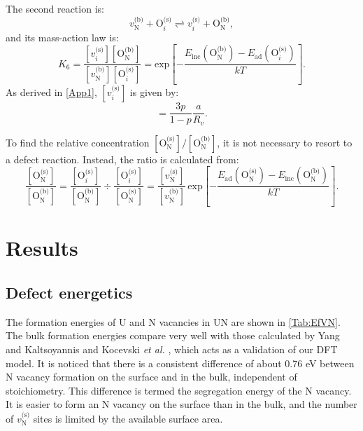 \documentclass[preprint,12pt,sort&compress]{elsarticle}
\newcommand{\?}{\stackrel{?}{=}}
\begin{document}
The second reaction is:
\begin{equation}
v_\text{N}^\text{(b)} + \text{O}_i^\text{(s)}  \rightleftharpoons v_i^\text{(s)} + \text{O}_\text{N}^\text{(b)},
\end{equation}
and its mass-action law is:
\begin{equation}
K_6 = \frac{ [ v_i^\text{(s)} ]  [ \text{O}_\text{N}^\text{(b)} ] } { [ v_\text{N}^\text{(b)} ] [ \text{O}_i^\text{(s)} ] } = \text{exp}\! \left[ - \frac{ E_\text{inc}( \text{O}_\text{N}^\text{(b)} ) - E_\text{ad}( \text{O}_i^\text{(s)} ) } { k T } \right].
\end{equation}
As derived in \ref{App1}, $[ v_i^\text{(s)} ]$ is given by:
\begin{equation}
[ v_i^\text{(s)} ] = \frac{3p}{1-p} \frac{a}{R_v}.
\label{Eq:v_i^s}
\end{equation}

To find the relative concentration $[ \text{O}_\text{N}^\text{(s)} ] / [ \text{O}_\text{N}^\text{(b)} ]$, it is not necessary to resort to a defect reaction. Instead, the ratio is calculated from: 
\begin{equation}
\frac{ [ \text{O}_\text{N}^\text{(s)} ] }{ [ \text{O}_\text{N}^\text{(b)} ] } = \frac{ [ \text{O}_i^\text{(s)} ] }{ [ \text{O}_\text{N}^\text{(b)} ] } \div \frac{ [ \text{O}_i^\text{(s)} ] }{ [ \text{O}_\text{N}^\text{(s)} ] } = \frac{ [v_\text{N}^\text{(s)}] }{ [v_\text{N}^\text{(b)}] } \, \text{exp}\! \left[ - \frac{ E_\text{ad}( \text{O}_\text{N}^\text{(s)} ) - E_\text{inc}( \text{O}_\text{N}^\text{(b)} ) } { k T } \right].
\label{Eq:ONs_ONb}
\end{equation}

\section{Results}
\label{Sec:Results}

\subsection{Defect energetics}
\label{Sec:DefE}

The formation energies of U and N vacancies in UN are shown in \cref{Tab:EfVN}. The bulk formation energies compare very well with those calculated by Yang and Kaltsoyannis \cite{Yang2021} and Kocevski \textit{et al.} \cite{Kocevski2022I}, which acts as a validation of our DFT model. It is noticed that there is a consistent difference of about 0.76 eV between N vacancy formation on the surface and in the bulk, independent of stoichiometry. This difference is termed the segregation energy of the N vacancy. It is easier to form an N vacancy on the surface than in the bulk, and the number of $v_\text{N}^\text{(s)}$ sites is limited by the available surface area.
\end{document}
